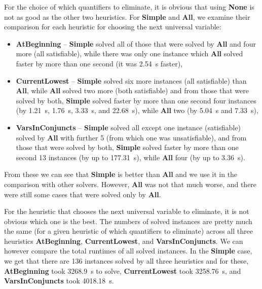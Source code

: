 \documentclass[
  digital, %
  color,
  twoside, %
  table,   %
  nolof,     %
  nolot,     %
]{fithesis3}
\theoremstyle{definition}
\theoremstyle{remark}
\newcommand{\QEnone}{\textbf{None}}
\newcommand{\QEsimple}{\textbf{Simple}}
\newcommand{\QEall}{\textbf{All}}
\newcommand{\QUatbeginning}{\textbf{At\-Be\-gin\-ning}}
\newcommand{\QUcurrentlowest}{\textbf{CurrentLowest}}
\newcommand{\QUvarsinconjuncts}{\textbf{VarsInConjuncts}}
\begin{document}
For the choice of which quantifiers to eliminate, it is obvious that using \QEnone{} is not as good as the other two heuristics. For \QEsimple{} and \QEall{}, we examine their comparison for each heuristic for choosing the next universal variable:
\begin{itemize}
    \item \QUatbeginning{} -- \QEsimple{} solved all of those that were solved by \QEall{} and four more (all satisfiable), while there was only one instance which \QEall{} solved faster by more than one second (it was \SI{2.54}{s} faster),
    \item \QUcurrentlowest{} -- \QEsimple{} solved six more instances (all satisfiable) than \QEall{}, while \QEall{} solved two more (both satisfiable) and from those that were solved by both, \QEsimple{} solved faster by more than one second four instances (by \SI{1.21}{s}, \SI{1.76}{s}, \SI{3.33}{s}, and \SI{22.68}{s}), while \QEall{} two (by \SI{5.04}{s} and \SI{7.33}{s}),
    \item \QUvarsinconjuncts{} -- \QEsimple{} solved all except one instance (satisfiable) solved by \QEall{} with further 5 (from which one was unsatisfiable), and from those that were solved by both, \QEsimple{} solved faster by more than one second 13 instances (by up to \SI{177.31}{s}), while \QEall{} four (by up to \SI{3.36}{s}).
\end{itemize}
From these we can see that \QEsimple{} is better than \QEall{} and we use it in the comparison with other solvers. However, \QEall{} was not that much worse, and there were still some cases that were solved only by \QEall{}.

For the heuristic that chooses the next universal variable to eliminate, it is not obvious which one is the best. The numbers of solved instances are pretty much the same (for a given heuristic of which quantifiers to eliminate) across all three heuristics \QUatbeginning{}, \QUcurrentlowest{}, and \QUvarsinconjuncts{}. We can however compare the total runtimes of all solved instances. In the \QEsimple{} case, we get that there are 136 instances solved by all three heuristics and for these, \QUatbeginning{} took \SI{3268.9}{s} to solve, \QUcurrentlowest{} took \SI{3258.76}{s}, and \QUvarsinconjuncts{} took \SI{4018.18}{s}.
\end{document}
